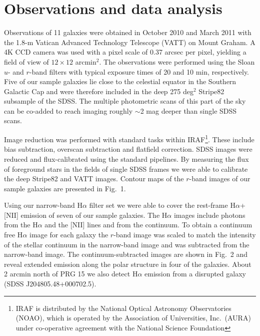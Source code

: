 \documentclass[useAMS,usenatbib]{mn2e}
\begin{document}
\section{Observations and data analysis}
\label{S:Obs_and_Red}
Observations of 11 galaxies were obtained in October 2010 and March 2011 with the 1.8-m Vatican Advanced
Technology Telescope (VATT) on Mount Graham. A 4K CCD camera was used with a pixel scale of 0.37 arcsec per pixel, yielding a field of view of $12 \times 12$ arcmin$^2$. The observations were performed using the Sloan $u$- and $r$-band filters with typical exposure times of 20 and 10 min, respectively.
Five of our sample galaxies lie close to the celestial equator in the Southern Galactic Cap and were therefore included in the deep 275 deg$^2$ Stripe82 subsample of the SDSS. The multiple photometric scans of this part of the sky can be co-added to reach imaging roughly $\sim$2 mag deeper than single SDSS scans.

Image reduction was performed with standard tasks within {\small IRAF}\footnote{IRAF is distributed by the National Optical Astronomy Observatories (NOAO), which is operated by the Association of Universities, Inc.\ (AURA) under co-operative agreement with the National Science Foundation}. These include bias subtraction, overscan subtraction and flatfield correction. 
SDSS images were reduced and flux-calibrated using the standard pipelines. 
By measuring the flux of foreground stars in the fields of single SDSS frames we were able to calibrate the deep Stripe82 and VATT images.
Contour maps of the $r$-band images of our sample galaxies are presented in Fig.\ 1.

Using our narrow-band H$\alpha$ filter set we were able to cover the rest-frame H$\alpha$+[NII] emission of seven of our sample galaxies.
The H$\alpha$ images include photons from the H$\alpha$ and the [NII] lines and from the continuum. 
To obtain a continuum free H$\alpha$ image for each galaxy the $r$-band image was scaled to match the intensity of the stellar continuum in the narrow-band image and was subtracted from the narrow-band image. 
The continuum-subtracted images are shown in Fig.\ 2 and reveal extended emission along the polar structure in four of the galaxies.
About 2 arcmin north of PRG 15 we also detect H$\alpha$ emission from a disrupted galaxy (SDSS J204805.48+000702.5). 
\end{document}
